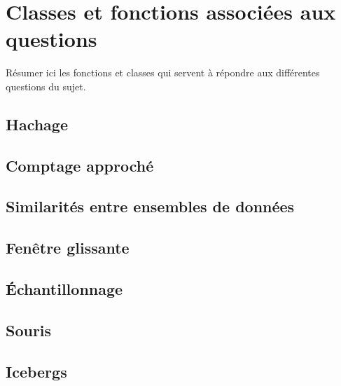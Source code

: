 \documentclass[12pt,a4paper,titlepage]{article}
\newcommand{\1}{\mbox{1\hspace{-.28em}l}}
\begin{document}
\newpage
\section{Classes et fonctions associées aux questions}
Résumer ici les fonctions et classes qui servent à répondre aux différentes questions du sujet.

\subsection{Hachage}


\subsection{Comptage approché}


\subsection{Similarités entre ensembles de données}


\subsection{Fenêtre glissante}


\subsection{Échantillonnage}


\subsection{Souris}


\subsection{Icebergs}
\end{document}
